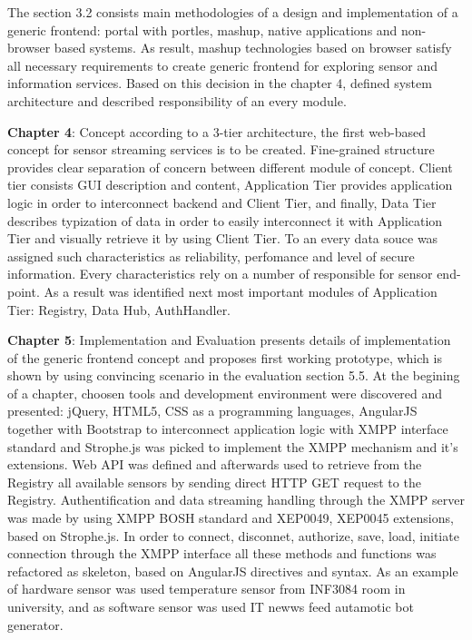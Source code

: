 	The section 3.2 consists main methodologies of a design and implementation of a generic frontend: portal with portles, mashup, native applications and non-browser based systems. As result, mashup technologies based on browser satisfy all necessary requirements to create generic frontend for exploring sensor and information services. Based on this decision in the chapter 4, defined system architecture and described responsibility of an every module.

    \textbf{Chapter 4}: Concept
    \newline
    according to a 3-tier architecture, the first web-based concept for sensor streaming services is to be created. Fine-grained structure provides clear separation of concern between different module of concept. Client tier consists GUI description and content, Application Tier provides application logic in order to interconnect backend and Client Tier, and finally, Data Tier describes typization of data in order to easily interconnect it with Application Tier and visually retrieve it by using Client Tier. To an every data souce was assigned such characteristics as reliability, perfomance and level of secure information. Every characteristics rely on a number of responsible for sensor end-point. As a result was identified next most important modules of Application Tier: Registry, Data Hub, AuthHandler.

    \textbf{Chapter 5}: Implementation and Evaluation
    \newline
    presents details of implementation of the generic frontend concept and proposes first working prototype, which is shown by using convincing scenario in the evaluation section 5.5. At the begining of a chapter, choosen tools and development environment were discovered and presented: jQuery, HTML5, CSS as a programming languages, AngularJS together with Bootstrap to interconnect application logic with XMPP interface standard and Strophe.js was picked to implement the XMPP mechanism and it's extensions. Web API was defined and afterwards used to retrieve from the Registry all available sensors by sending direct HTTP GET request to the Registry. Authentification and data streaming handling through the XMPP server was made by using XMPP BOSH standard and XEP0049, XEP0045 extensions, based on Strophe.js. In order to connect, disconnet, authorize, save, load, initiate connection through the XMPP interface all these methods and functions was refactored as skeleton, based on AngularJS directives and syntax. As an example of hardware sensor was used temperature sensor from INF3084 room in university, and as software sensor was used IT newws feed autamotic bot generator.

